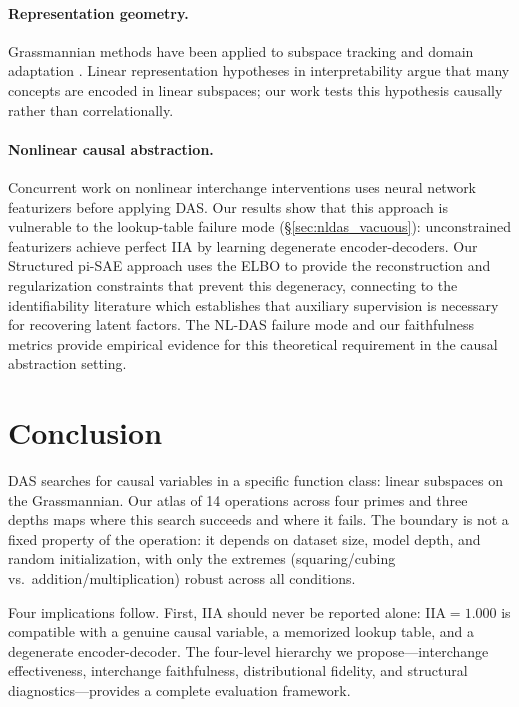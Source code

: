 \documentclass{article}
\newcommand{\IIA}{\mathrm{IIA}}
\begin{document}
\paragraph{Representation geometry.}
Grassmannian methods have been applied to subspace tracking and domain adaptation
\citep{edelman1998geometry, gopalan2011domain}. Linear representation hypotheses
in interpretability \citep{marks2023geometry, engels2024language,
park2024linear} argue that many concepts are encoded in linear subspaces; our
work tests this hypothesis causally rather than correlationally.

\paragraph{Nonlinear causal abstraction.}
Concurrent work on nonlinear interchange interventions
\citep{geiger2024causal} uses neural network featurizers before applying DAS.
Our results show that this approach is vulnerable to the lookup-table failure
mode (\S\ref{sec:nldas_vacuous}): unconstrained featurizers achieve perfect IIA
by learning degenerate encoder-decoders. Our Structured pi-SAE approach uses the
ELBO to provide the reconstruction and regularization constraints that prevent
this degeneracy, connecting to the identifiability literature
\citep{khemakhem2020variational, sutter2020multimodal} which establishes that
auxiliary supervision is necessary for recovering latent factors. The NL-DAS
failure mode and our faithfulness metrics provide empirical evidence for this
theoretical requirement in the causal abstraction setting.


\section{Conclusion}
\label{sec:conclusion}

DAS searches for causal variables in a specific function class: linear
subspaces on the Grassmannian. Our atlas of 14 operations across four primes
and three depths maps where this search succeeds and where it fails. The
boundary is not a fixed property of the operation: it depends on dataset
size, model depth, and random initialization, with only the extremes
(squaring/cubing vs.\ addition/multiplication) robust across all conditions.

Four implications follow. First, IIA should never be reported alone:
$\IIA = 1.000$ is compatible with a genuine causal variable, a memorized
lookup table, and a degenerate encoder-decoder. The four-level hierarchy we
propose---interchange effectiveness, interchange faithfulness, distributional
fidelity, and structural diagnostics---provides a complete evaluation
framework.
\end{document}
